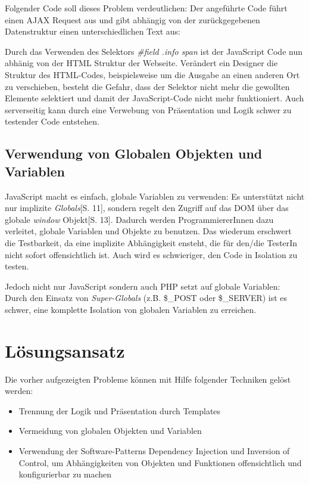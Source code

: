 \documentclass[a4paper,bibtotoc,oneside]{scrbook}
\begin{document}
Folgender Code soll dieses Problem verdeutlichen: Der angeführte Code führt einen AJAX Request aus und gibt abhängig von der zurückgegebenen Datenstruktur einen unterschiedlichen Text aus:



Durch das Verwenden des Selektors \emph{\#field .info span} ist der JavaScript Code nun abhänig von der HTML Struktur der Webseite. Verändert ein Designer  die Struktur des HTML-Codes, beispielsweise um die Ausgabe an einen anderen Ort zu verschieben, besteht die Gefahr, dass der Selektor nicht mehr die gewollten Elemente selektiert und damit der JavaScript-Code nicht mehr funktioniert. Auch serverseitig kann durch eine Verwebung von Präsentation und Logik schwer zu testender Code entstehen.

\subsection{Verwendung von Globalen Objekten und Variablen}
JavaScript macht es einfach, globale Variablen zu verwenden: Es unterstützt nicht nur implizite \emph{Globals}\cite{js_patterns}[S. 11], sondern regelt den Zugriff auf das DOM über das globale \emph{window} Objekt\cite{js_patterns}[S. 13]. Dadurch werden ProgrammiererInnen dazu verleitet, globale Variablen und Objekte zu benutzen. Das wiederum erschwert die Testbarkeit, da eine implizite Abhängigkeit ensteht, die für den/die TesterIn nicht sofort offensichtlich ist. Auch wird es schwieriger, den Code in Isolation zu testen.

Jedoch nicht nur JavaScript sondern auch PHP setzt auf globale Variablen: Durch den Einsatz von \emph{Super-Globals} (z.B. \$\_POST oder \$\_SERVER) ist es schwer, eine komplette Isolation von globalen Variablen zu erreichen.
\newpage
\section{Lösungsansatz}
Die vorher aufgezeigten Probleme können mit Hilfe folgender Techniken gelöst werden:

\begin{itemize}
	\item Trennung der Logik und Präsentation durch Templates
	\item Vermeidung von globalen Objekten und Variablen
	\item Verwendung der Software-Patterns Dependency Injection und Inversion of Control, um Abhängigkeiten von Objekten und Funktionen offensichtlich und konfigurierbar zu machen
\end{itemize}
\end{document}
